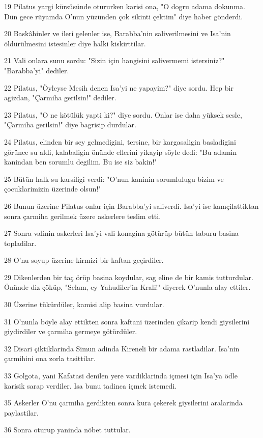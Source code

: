 \par 19 Pilatus yargi kürsüsünde otururken karisi ona, "O dogru adama dokunma. Dün gece rüyamda O'nun yüzünden çok sikinti çektim" diye haber gönderdi.
\par 20 Baskâhinler ve ileri gelenler ise, Barabba'nin saliverilmesini ve Isa'nin öldürülmesini istesinler diye halki kiskirttilar.
\par 21 Vali onlara sunu sordu: "Sizin için hangisini salivermemi istersiniz?" "Barabba'yi" dediler.
\par 22 Pilatus, "Öyleyse Mesih denen Isa'yi ne yapayim?" diye sordu. Hep bir agizdan, "Çarmiha gerilsin!" dediler.
\par 23 Pilatus, "O ne kötülük yapti ki?" diye sordu. Onlar ise daha yüksek sesle, "Çarmiha gerilsin!" diye bagrisip durdular.
\par 24 Pilatus, elinden bir sey gelmedigini, tersine, bir kargasaligin basladigini görünce su aldi, kalabaligin önünde ellerini yikayip söyle dedi: "Bu adamin kanindan ben sorumlu degilim. Bu ise siz bakin!"
\par 25 Bütün halk su karsiligi verdi: "O'nun kaninin sorumlulugu bizim ve çocuklarimizin üzerinde olsun!"
\par 26 Bunun üzerine Pilatus onlar için Barabba'yi saliverdi. Isa'yi ise kamçilattiktan sonra çarmiha gerilmek üzere askerlere teslim etti.
\par 27 Sonra valinin askerleri Isa'yi vali konagina götürüp bütün taburu basina topladilar.
\par 28 O'nu soyup üzerine kirmizi bir kaftan geçirdiler.
\par 29 Dikenlerden bir taç örüp basina koydular, sag eline de bir kamis tutturdular. Önünde diz çöküp, "Selam, ey Yahudiler'in Krali!" diyerek O'nunla alay ettiler.
\par 30 Üzerine tükürdüler, kamisi alip basina vurdular.
\par 31 O'nunla böyle alay ettikten sonra kaftani üzerinden çikarip kendi giysilerini giydirdiler ve çarmiha germeye götürdüler.
\par 32 Disari çiktiklarinda Simun adinda Kireneli bir adama rastladilar. Isa'nin çarmihini ona zorla tasittilar.
\par 33 Golgota, yani Kafatasi denilen yere vardiklarinda içmesi için Isa'ya ödle karisik sarap verdiler. Isa bunu tadinca içmek istemedi.
\par 35 Askerler O'nu çarmiha gerdikten sonra kura çekerek giysilerini aralarinda paylastilar.
\par 36 Sonra oturup yaninda nöbet tuttular.
